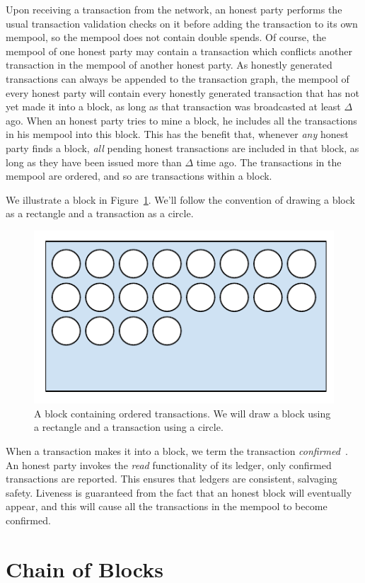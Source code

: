 Upon receiving a transaction from the network, an honest party performs the usual transaction
validation checks on it before adding the transaction to its own mempool, so the mempool
does not contain double spends. Of course, the mempool of one honest party may contain a
transaction which conflicts another transaction in the mempool of another honest party.
As honestly generated transactions can always be appended to the transaction graph,
the mempool of every honest party will contain every honestly generated transaction
that has not yet made it into a block, as long as that transaction was broadcasted
at least $\Delta$ ago. When an honest party tries to mine a block,
he includes all the transactions in his mempool into this block. This has the benefit
that, whenever \emph{any} honest party finds a block, \emph{all} pending honest transactions
are included in that block, as long as they have been issued more than $\Delta$ time ago.
The transactions in the mempool are ordered, and so are transactions within a block.

We illustrate a block in Figure~\ref{fig.block}. We'll follow the convention of drawing
a block as a rectangle and a transaction as a circle.

\begin{figure}[h]
    \centering
    \includegraphics[width=0.5 \columnwidth,keepaspectratio]{figures/block.pdf}
    \caption{A block containing ordered transactions. We will draw a block using a rectangle
             and a transaction using a circle.}
    \label{fig.block}
\end{figure}

When a transaction makes it into a block, we term the transaction
\emph{confirmed}~. An honest party invokes the \emph{read} functionality
of its ledger, only confirmed transactions are reported. This ensures that ledgers
are consistent, salvaging safety. Liveness is guaranteed from the fact that an honest
block will eventually appear, and this will cause all the transactions in the mempool to
become confirmed.

\section{Chain of Blocks}

